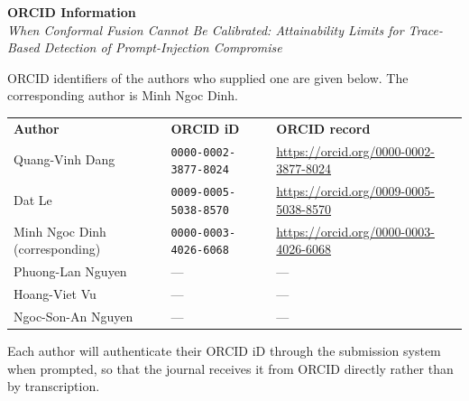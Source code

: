 \documentclass[11pt]{article}
\begin{document}
\begin{center}
{\large\bfseries ORCID Information}\\[0.4em]
\emph{When Conformal Fusion Cannot Be Calibrated: Attainability Limits
for Trace-Based Detection of Prompt-Injection Compromise}
\end{center}

\vspace{1.2em}

\noindent
ORCID identifiers of the authors who supplied one are given below. The
corresponding author is Minh Ngoc Dinh.

\vspace{1em}

\noindent
\begin{tabular}{@{}p{}p{}p{}@{}}
\textbf{Author} & \textbf{ORCID iD} & \textbf{ORCID record} \\[0.5em]
Quang-Vinh Dang & \texttt{0000-0002-3877-8024} & \url{https://orcid.org/0000-0002-3877-8024} \\[0.5em]
Dat Le & \texttt{0009-0005-5038-8570} & \url{https://orcid.org/0009-0005-5038-8570} \\[0.5em]
Minh Ngoc Dinh (corresponding) & \texttt{0000-0003-4026-6068} & \url{https://orcid.org/0000-0003-4026-6068} \\[0.5em]
Phuong-Lan Nguyen & --- & --- \\[0.5em]
Hoang-Viet Vu & --- & --- \\[0.5em]
Ngoc-Son-An Nguyen & --- & --- \\
\end{tabular}

\vspace{1.5em}

\noindent
Each author will authenticate their ORCID iD through the submission system when
prompted, so that the journal receives it from ORCID directly rather than by
transcription.
\end{document}
